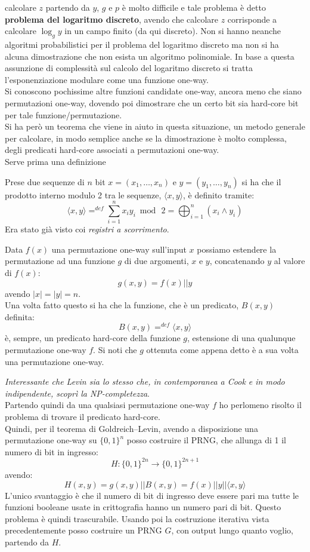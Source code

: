 \documentclass[a4paper,12pt, oneside]{book}
\begin{document}
calcolare $z$ partendo da $y$, $g$ e $p$ è molto difficile e tale problema è
detto \textbf{problema del logaritmo discreto}, avendo che calcolare $z$
corrisponde a calcolare $\log_g y$ in un campo finito (da qui discreto). Non si
hanno neanche algoritmi probabilistici per il problema del logaritmo discreto ma
non si ha alcuna dimostrazione che non esista un algoritmo polinomiale. In base
a questa assunzione di complessità sul calcolo del logaritmo discreto si tratta
l'esponenziazione modulare come una funzione one-way.\\ 
Si conoscono pochissime altre funzioni candidate one-way, ancora meno che siano
permutazioni one-way, dovendo poi dimostrare che un certo bit sia hard-core bit
per tale funzione/permutazione.\\
Si ha però un teorema che viene in aiuto in questa situazione, un metodo
generale per calcolare, in modo semplice anche se la dimostrazione è molto
complessa, degli predicati hard-core associati a permutazioni one-way.\\ 
Serve prima una definizione
\begin{definizione}
  Prese due sequenze di $n$ bit $x=(x_1,\ldots,x_n)$ e $y=(y_1,\ldots,y_n)$ si
  ha che il prodotto interno modulo 2 tra le sequenze, $\langle x,y\rangle$, è
  definito tramite: 
  \[\langle x,y\rangle=^{def}\sum_{i=1}^n
    x_iy_i\bmod\,2=\bigoplus_{i=1}^n(x_i\land y_i)\]
  Era stato già visto coi \emph{registri a scorrimento}.
\end{definizione}
\begin{teorema}
  Data $f(x)$ una permutazione one-way sull'input $x$ possiamo estendere la
  permutazione ad una funzione $g$ di due argomenti, $x$ e $y$, concatenando $y$
  al valore di $f(x)$: 
  \[g(x,y)=f(x)||y\]
  avendo $|x|=|y|=n$.\\
  Una volta fatto questo si ha che la funzione, che è un predicato, $B(x,y)$
  definita: 
  \[B(x,y)=^{def}\langle x,y\rangle\]
  è, sempre, un predicato hard-core della funzione $g$, estensione di una
  qualunque permutazione one-way $f$. Si noti che $g$ ottenuta come appena detto
  è a sua volta una permutazione one-way.
\end{teorema}
\textit{Interessante che Levin sia lo stesso che, in contemporanea a Cook e in
  modo indipendente, scoprì la NP-completezza}. \\
Partendo quindi da una qualsiasi permutazione one-way $f$ ho perlomeno risolto
il problema di trovare il predicato hard-core.\\
Quindi, per il teorema di Goldreich–Levin, avendo a disposizione una
permutazione one-way su $\{0,1\}^n$ posso costruire il PRNG, che allunga di 1 il
numero di bit in ingresso:
\[H:\{0,1\}^{2n}\to \{0,1\}^{2n+1}\]
avendo:
\[H(x,y)=g(x,y)||B(x,y)=f(x)||y||\langle x,y\rangle\]
L'unico svantaggio è che il numero di bit di ingresso deve essere pari ma tutte
le funzioni booleane usate in crittografia hanno un numero pari di bit. Questo
problema è quindi trascurabile. Usando poi la costruzione iterativa vista
precedentemente posso costruire un PRNG $G$, con output lungo quanto voglio,
partendo da $H$.
\end{document}
